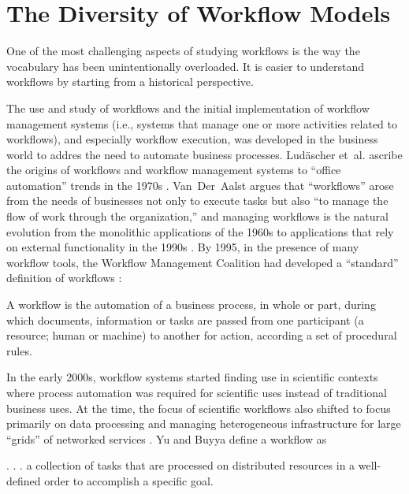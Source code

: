 \section{The Diversity of Workflow Models}\label{workflows}

One of the most challenging aspects of studying workflows is the way the
vocabulary has been unintentionally overloaded.  It is easier to
understand workflows by starting from a historical perspective.

The use and study of workflows and the initial implementation of workflow
management systems (i.e., systems that manage one or more activities related to
workflows), and especially workflow execution, was developed in the business
world to addres the need to automate business processes. Lud\"{a}scher et~al. 
ascribe the origins of workflows and workflow management systems to ``office
automation'' trends in the 1970s \cite{ludascher_scientific_2006}.
Van~Der~Aalst argues that ``workflows'' arose from the needs of businesses not
only to execute tasks but also ``to manage the flow of work through
the organization,'' and managing workflows is the natural evolution from the
monolithic applications of the 1960s to applications that rely on external
functionality in the 1990s \cite{van_der_aalst_application_1998}. By 1995, in
the presence of many workflow tools, the Workflow Management Coalition had
developed a ``standard'' definition of workflows
\cite{hollingsworth_workflow_1993}:

\begin{displayquote} A workflow is the automation of a business process, in
whole or part, during which documents, information or tasks are passed from one
participant (a resource; human or machine) to another for action, according a
set of procedural rules.  \end{displayquote}

In the early 2000s, workflow systems started finding use in scientific contexts
where process automation was required for scientific uses instead of traditional
business uses. At the time, the focus of scientific workflows also shifted to
focus primarily on data processing and managing heterogeneous infrastructure for
large ``grids'' of networked services \cite{yu_taxonomy_2005}. Yu and Buyya
define a workflow as 

\begin{displayquote}. . .  a collection of tasks that are processed on
distributed resources in a well-defined order to accomplish a specific
goal.\end{displayquote}

